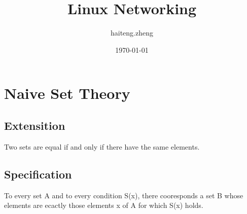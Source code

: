 

\title{Linux Networking}
\author{haiteng.zheng}
\date{\today}


\maketitle
\tableofcontents

\section{Naive Set Theory}
\begin{tcolorbox}

\end{tcolorbox}
\subsection{Extensition}
\begin{axiom}
	Two sets are equal if and only if there have the same elements.
\end{axiom}
\subsection{Specification}
\begin{axiom}
	To every set A and to every condition S(x), there cooresponds a set B whose elements are ecactly those elements x of A for which S(x) holds.
\end{axiom}


